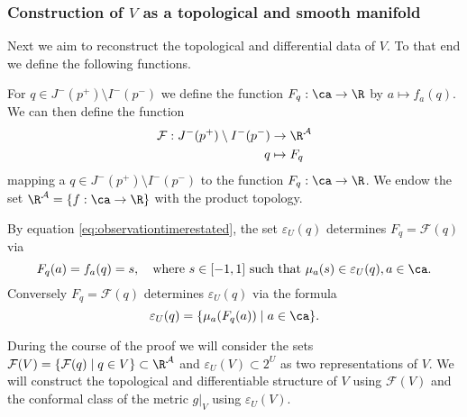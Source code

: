 \subsubsection{Construction of $V$ as a topological and smooth manifold}
Next we aim to reconstruct the topological and differential data of $V$. To that end we define the following functions.

For $q\in J^-(p^+)\setminus I^-(p^-)$ we define the function $F_q:\ca\to\R$ by $a\mapsto f_a(q)$. We can then define the function 
\begin{align*}
    \mathcal{F}:J^-(p^+)\setminus I^-(p^-) &\to \R^\mathcal{A}\\
    q&\mapsto F_q
\end{align*} mapping a $q\in J^-(p^+)\setminus I^-(p^-)$ to the function $F_q:\ca\to\R$. We endow the set $\R^\mathcal{A} = \{f:\ca\to \R\}$ with the product topology.

By equation \eqref{eq:observationtimerestated}, the set $\varepsilon_U(q)$ determines $F_q=\mathcal{F}(q)$ via
\begin{equation}\label{eq:epsdetfq}
    F_q(a) = f_a(q) = s,\quad \text{where $s\in [-1,1]$ such that $\mu_a(s)\in \varepsilon_U(q), a\in \ca$}.
\end{equation}
Conversely $F_q=\mathcal{F}(q)$ determines $\varepsilon_U(q)$ via the formula
\begin{equation}\label{eq:fqdeteps}
    \varepsilon_U(q) = \{\mu_a(F_q(a)) \mid a\in \ca\}.
\end{equation}

During the course of the proof we will consider the sets $\mathcal{F}(V) = \{\mathcal{F}(q) \mid q\in V\}\subset \R^\mathcal{A}$ and $\varepsilon_U(V)\subset 2^U$ as two representations of $V$. We will construct the topological and differentiable structure of $V$ using $\mathcal{F}(V)$ and the conformal class of the metric $g\rvert_V$ using $\varepsilon_U(V)$.

